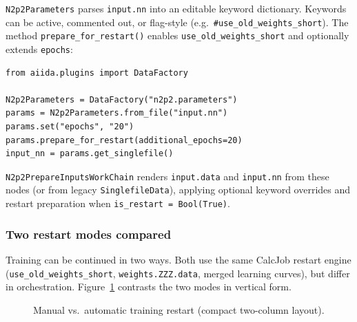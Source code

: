 \texttt{N2p2Parameters} parses \texttt{input.nn} into an editable keyword dictionary.
Keywords can be active, commented out, or flag-style (e.g.\
\texttt{\#use\_old\_weights\_short}).
The method \texttt{prepare\_for\_restart()} enables \texttt{use\_old\_weights\_short}
and optionally extends \texttt{epochs}:
\begin{lstlisting}
from aiida.plugins import DataFactory

N2p2Parameters = DataFactory("n2p2.parameters")
params = N2p2Parameters.from_file("input.nn")
params.set("epochs", "20")
params.prepare_for_restart(additional_epochs=20)
input_nn = params.get_singlefile()
\end{lstlisting}

\texttt{N2p2PrepareInputsWorkChain} renders \texttt{input.data} and \texttt{input.nn}
from these nodes (or from legacy \texttt{SinglefileData}), applying optional keyword
overrides and restart preparation when \texttt{is\_restart = Bool(True)}.

\subsubsection{Two restart modes compared}
\label{subsubsec:restart-modes}

Training can be continued in two ways.
Both use the same CalcJob restart engine (\texttt{use\_old\_weights\_short},
\texttt{weights.ZZZ.data}, merged learning curves), but differ in orchestration.
Figure~\ref{fig:restart-flow} contrasts the two modes in vertical form.

\begin{figure}[htbp]
  \centering
  \caption{Manual vs.\ automatic training restart (compact two-column layout).}
  \label{fig:restart-flow}
\end{figure}

